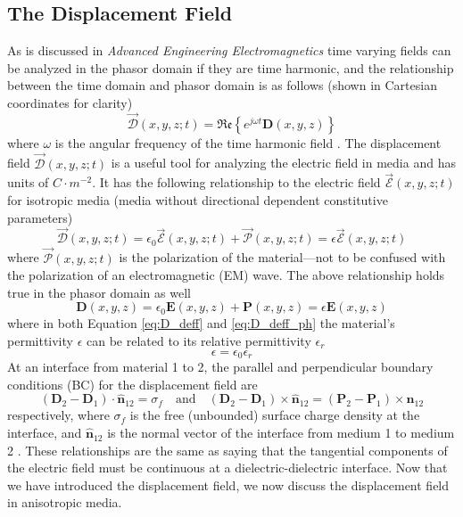 \documentclass{optica-article}
\newcommand{\bv}[1]{\mathbf{#1}}
\begin{document}
\subsection{The Displacement Field}
As is discussed in \textit{Advanced Engineering Electromagnetics} time varying
fields can be analyzed in the phasor domain if they are time harmonic, and the
relationship between the time domain and phasor domain is as follows 
(shown in Cartesian coordinates for clarity)
\begin{equation}
\vec{\mathscr{D}}(x,y,z; t) = 
\mathfrak{Re}\left\{ e^{j\omega t}\bv{D}(x,y,z)\right\}
\end{equation}
where $\omega$ is the angular frequency of the time harmonic field 
\cite{Balanis-2012}. The displacement field $\vec{\mathscr{D}}(x,y,z; t)$ is 
a useful tool for analyzing the electric field in media and has units of
$\si{C\cdot m^{-2}}$. It
has the following
relationship to the electric field $\vec{\mathscr{E}}(x,y,z; t)$ for isotropic
media (media without directional dependent constitutive parameters)
\begin{equation}\label{eq:D_deff}
  \vec{\mathscr{D}}(x,y,z; t) = \epsilon_0 \vec{\mathscr{E}}(x,y,z; t) + 
  \vec{\mathscr{P}}(x,y,z; t) 
  = \epsilon \vec{\mathscr{E}}(x,y,z; t)
\end{equation}
where $\vec{\mathscr{P}}(x,y,z; t)$ is the polarization of the material---not to
be confused with the polarization of an electromagnetic (EM) wave. The above
relationship holds true in the phasor domain as well
\begin{equation}\label{eq:D_deff_ph}
  \bv{D}(x,y,z) = \epsilon_0 \bv{E}(x,y,z) + \bv{P}(x,y,z)
  = \epsilon \bv{E}(x,y,z)
\end{equation}
where in both Equation \eqref{eq:D_deff} and \eqref{eq:D_deff_ph} the material's
permittivity $\epsilon$ can be related to its relative permittivity $\epsilon_r$
\cite{griffithsEM}
\begin{equation}
\epsilon = \epsilon_0\epsilon_r
\end{equation}
At an interface from material 1 to 2, the parallel and perpendicular boundary 
conditions (BC) for the 
displacement field are
\begin{equation}\label{eq:D_BC}
  (\bv{D}_2 - \bv{D}_1)\cdot \bv{\hat{n}}_{12} = \sigma_f
\quad\text{and}\quad
  (\bv{D}_2 - \bv{D}_1) \times \bv{\hat{n}}_{12} =
 (\bv{P}_2 - \bv{P}_1) \times \bv{\hat{n}}_{12}
\end{equation}
respectively, where $\sigma_f$ is the free (unbounded) surface charge density at
the interface, and $\bv{\hat{n}}_{12}$
is the normal vector of the interface from medium 1 to medium 2 
\cite{griffithsEM}. These 
relationships are the same as saying that the tangential components of the 
electric field must be continuous at a dielectric-dielectric interface.
Now that we have introduced the displacement field, we now discuss the 
displacement field in anisotropic media.
\end{document}
